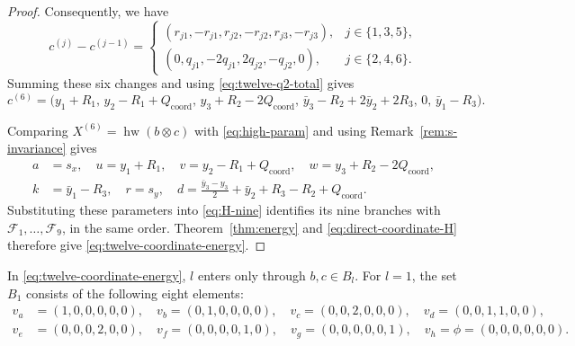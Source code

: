 \documentclass[11pt,reqno]{amsart}
\newcommand{\hw}{\operatorname{hw}}
\numberwithin{table}{section}
\numberwithin{equation}{section}
\theoremstyle{plain}
\theoremstyle{definition}
\begin{document}
\begin{proof}
	Consequently, we have
	\[
	c^{(j)}-c^{(j-1)}
	=
	\begin{cases}
		(r_{j1},-r_{j1},r_{j2},-r_{j2},r_{j3},-r_{j3}),
		&j\in\{1,3,5\},\\[1mm]
		(0,q_{j1},-2q_{j1},2q_{j2},-q_{j2},0),
		&j\in\{2,4,6\}.
	\end{cases}
	\]
	Summing these six changes and using
	\eqref{eq:twelve-q2-total} gives
	\[
	c^{(6)}
	=
	\bigl(
	y_1+R_1,\,
	y_2-R_1+Q_{\mathrm{coord}},\,
	y_3+R_2-2Q_{\mathrm{coord}},\,
	\bar y_3-R_2+2\bar y_2+2R_3,\,
	0,\,
	\bar y_1-R_3
	\bigr).
	\]
	
	Comparing \(X^{(6)}=\hw(b\otimes c)\) with
	\eqref{eq:high-param} and using Remark~\ref{rem:s-invariance}
	gives
	\[
	\begin{aligned}
		a&=s_x,
		\quad
		u=y_1+R_1,
		\quad
		v=y_2-R_1+Q_{\mathrm{coord}},
		\quad
		w=y_3+R_2-2Q_{\mathrm{coord}},
		\\
		k&=\bar y_1-R_3,
		\quad
		r=s_y,
		\quad
		d=
		\frac{\bar y_3-y_3}{2}
		+\bar y_2+R_3-R_2+Q_{\mathrm{coord}}.
	\end{aligned}
	\]
	Substituting these parameters into \eqref{eq:H-nine}
	identifies its nine branches with
	\(\mathcal F_1,\ldots,\mathcal F_9\), in the same order.
	Theorem~\ref{thm:energy} and \eqref{eq:direct-coordinate-H}
	therefore give \eqref{eq:twelve-coordinate-energy}.
\end{proof}

In \eqref{eq:twelve-coordinate-energy}, \(l\) enters only through
\(b,c\in B_l\).
For \(l=1\), the set \(B_1\) consists of the following eight elements:
\[
\begin{aligned}
	v_a&=(1,0,0,0,0,0),\quad
	v_b=(0,1,0,0,0,0),\quad
	v_c=(0,0,2,0,0,0),\quad
	v_d=(0,0,1,1,0,0),\\
	v_e&=(0,0,0,2,0,0),\quad
	v_f=(0,0,0,0,1,0),\quad
	v_g=(0,0,0,0,0,1),\quad
	v_h=\phi=(0,0,0,0,0,0).
\end{aligned}
\]
\end{document}
